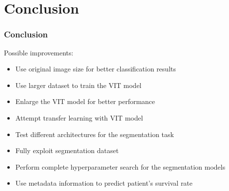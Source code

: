 \documentclass[../presentation.tex]{subfiles} %
\begin{document}
\section{Conclusion}

\begin{frame}
    
    \frametitle{Conclusion}

    Possible improvements:
    \vspace{0.2cm}
    \begin{itemize}
        \item Use original image size for better classification results
        \item Use larger dataset to train the VIT model
        \item Enlarge the VIT model for better performance
        \item Attempt transfer learning with VIT model
        \item Test different architectures for the segmentation task
        \item Fully exploit segmentation dataset
        \item Perform complete hyperparameter search for the segmentation models
        \item Use metadata information to predict patient's survival rate
    \end{itemize}

\end{frame}
\end{document}

